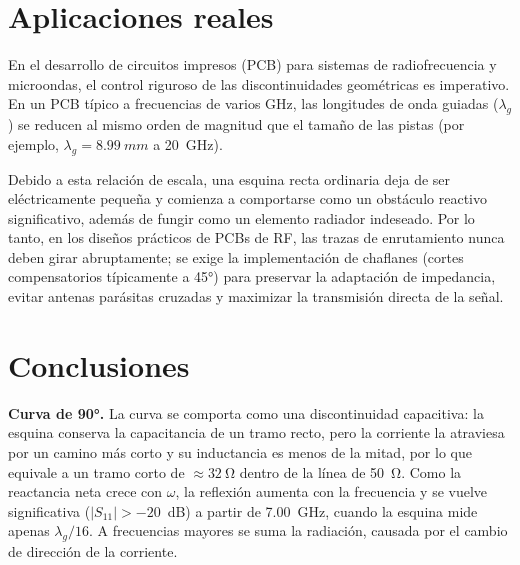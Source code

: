 \documentclass[11pt,letterpaper]{article}
\begin{document}
\section{Aplicaciones reales}
\label{sec:aplicaciones_reales}

En el desarrollo de circuitos impresos (PCB) para sistemas de radiofrecuencia y microondas, el control riguroso de las discontinuidades geométricas es imperativo. En un PCB típico a frecuencias de varios GHz, las longitudes de onda guiadas ($\lambda_g$) se reducen al mismo orden de magnitud que el tamaño de las pistas (por ejemplo, $\lambda_g = \SI{8.99}{mm}$ a \SI{20}{GHz}). 

Debido a esta relación de escala, una esquina recta ordinaria deja de ser eléctricamente pequeña y comienza a comportarse como un obstáculo reactivo significativo, además de fungir como un elemento radiador indeseado. Por lo tanto, en los diseños prácticos de PCBs de RF, las trazas de enrutamiento nunca deben girar abruptamente; se exige la implementación de chaflanes (cortes compensatorios típicamente a \ang{45}) para preservar la adaptación de impedancia, evitar antenas parásitas cruzadas y maximizar la transmisión directa de la señal.


\section{Conclusiones}

\textbf{Curva de \ang{90}.} La curva se comporta como una discontinuidad capacitiva: la esquina conserva la capacitancia de un tramo recto, pero la corriente la atraviesa por un camino más corto y su inductancia es menos de la mitad, por lo que equivale a un tramo corto de $\approx\SI{32}{\ohm}$ dentro de la línea de \SI{50}{\ohm}. Como la reactancia neta crece con $\omega$, la reflexión aumenta con la frecuencia y se vuelve significativa ($|S_{11}|>-20$~dB) a partir de \SI{7.00}{GHz}, cuando la esquina mide apenas $\lambda_g/16$. A frecuencias mayores se suma la radiación, causada por el cambio de dirección de la corriente.
\end{document}

